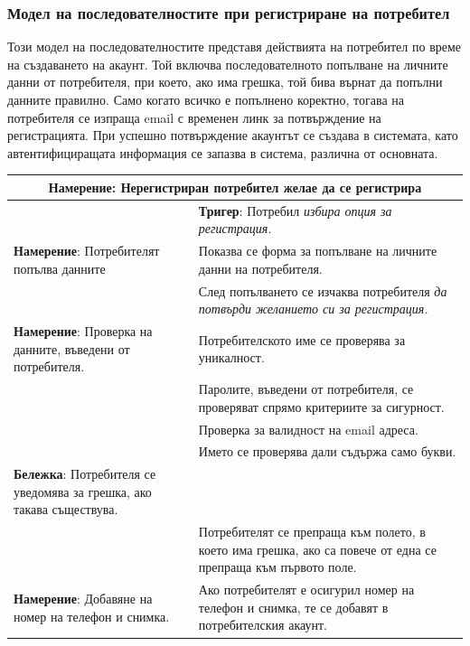 \documentclass[a4paper]{article}
\begin{document}
	
\subsubsection{Модел на последователностите при регистриране на потребител}		
	
Този модел на последователностите представя действията на потребител по време на създаването на акаунт. Той включва последователното попълване на личните данни от потребителя, при което, ако има грешка, той бива върнат да попълни данните правилно. Само когато всичко е попълнено коректно, тогава на потребителя се изпраща email с временен линк за потвърждение на регистрацията. При успешно потвърждение акаунтът се създава в системата, като автентифициращата информация се запазва в система, различна от основната.

\begin{center}
  \begin{tabular}{ |p{5cm}|p{10cm}| }
    \hline
    \multicolumn{2}{|c|}{\textbf{Намерение}: Нерегистриран потребител желае да се регистрира} \\
    \hline
    & \textbf{Тригер}: Потребил \emph{избира опция за регистрация.} \\
    \hline
      \textbf{Намерение}: Потребителят попълва данните & Показва се форма за попълване на личните данни на потребителя. \\
    \hline
     & След попълването се изчаква потребителя \emph{да потвърди желанието си за регистрация.} \\
    \hline
    \textbf{Намерение}: Проверка на данните, въведени от потребителя. & Потребителското име се проверява за уникалност. \\
    \hline
     & Паролите, въведени от потребителя, се проверяват спрямо критериите за сигурност. \\
    \hline
     & Проверка за валидност на email адреса. \\
    \hline
     & Името се проверява дали съдържа само букви. \\
    \hline
    \textbf{Бележка}: Потребителя се уведомява за грешка, ако такава съществува.  & \\
    \hline
      & Потребителят се препраща към полето, в което има грешка, ако са повече от една се препраща към първото поле. \\
    \hline
    \textbf{Намерение}: Добавяне на номер на телефон и снимка. & Ако потребителят е осигурил номер на телефон и снимка, те се добавят в потребителския акаунт.  \\

\end{tabular}
\end{center}
\end{document}
